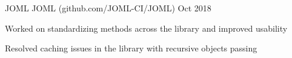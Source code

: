 \begin{cventries}
    \cventry
    {JOML} %
    {JOML ({\tiny github.com/JOML-CI/JOML})} %
    {} %
    {Oct 2018} %
    {
      \begin{cvitems} %
        \item{Worked on standardizing methods across the library and improved usability}
        \item{Resolved caching issues in the library with recursive objects passing}
      \end{cvitems}
    }
    
   
   
  

\end{cventries}
